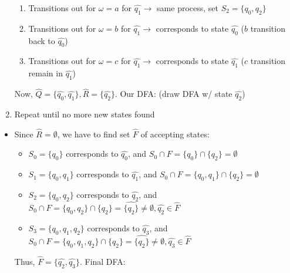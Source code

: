 \documentclass{article}
\begin{document}
\begin{enumerate}
    \begin{enumerate}
        \item Transitions out for $\omega=a$ for $\hat{q_1}\rightarrow$ same process, set $S_2=\{q_0,q_2\}$
        \item Transitions out for $\omega=b$ for $\hat{q_1}\rightarrow$ corresponds to state $\hat{q_0}$ ($b$ transition back to $\hat{q_0}$)
        \item Transitions out for $\omega=c$ for $\hat{q_1}\rightarrow$ corresponds to state $\hat{q_1}$ ($c$ transition remain in $\hat{q_1}$)
    \end{enumerate}
    Now, $\hat{Q}=\{\hat{q_0},\hat{q_1}\},\hat{R}=\{\hat{q_2}\}$. Our DFA: (draw DFA w/ state $\hat{q_2}$)
    \item Repeat until no more new states found
\end{enumerate}
\begin{itemize}
    \item Since $\hat{R}=\emptyset$, we have to find set $\hat{F}$ of accepting states:
    \begin{itemize}
        \item $S_0=\{q_0\}$ corresponds to $\hat{q_0}$, and $S_0\cap F=\{q_0\}\cap\{q_2\}=\emptyset$
        \item $S_1=\{q_0,q_1\}$ corresponds to $\hat{q_1}$, and $S_0\cap F=\{q_0,q_1\}\cap\{q_2\}=\emptyset$
        \item $S_2=\{q_0,q_2\}$ corresponds to $\hat{q_2}$, and $S_0\cap F=\{q_0,q_2\}\cap\{q_2\}=\hat{\{q_2\}}\neq\emptyset,\hat{q_2}\in\hat{F}$
        \item $S_3=\{q_0,q_1,q_2\}$ corresponds to $\hat{q_3}$, and $S_0\cap F=\{q_0,q_1,q_2\}\cap\{q_2\}=\hat{\{q_2\}}\neq\emptyset,\hat{q_3}\in\hat{F}$
    \end{itemize}
    Thus, $\hat{F}=\{\hat{q_2},\hat{q_3}\}$. Final DFA:
\end{itemize}
\end{document}
